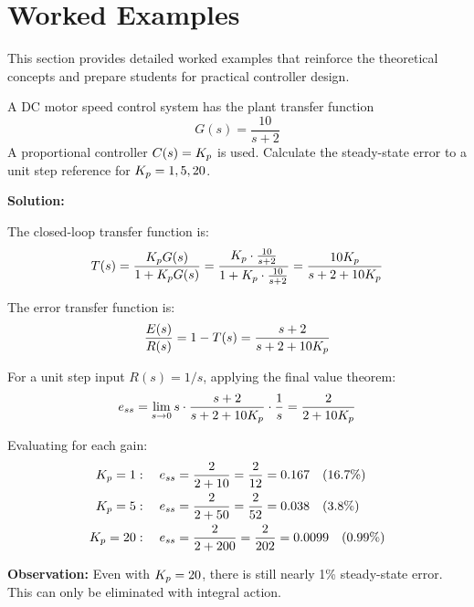 \section{Worked Examples}

This section provides detailed worked examples that reinforce the theoretical concepts and prepare students for practical controller design.

\begin{examplebox}
\label{ex:p_only_error}
A DC motor speed control system has the plant transfer function
\begin{equation*}
G(s) = \frac{10}{s + 2}
\end{equation*}
A proportional controller $C(s) = K_p$ is used. Calculate the steady-state error to a unit step reference for $K_p = 1, 5, 20$.

\textbf{Solution:}

The closed-loop transfer function is:
\begin{equation*}
T(s) = \frac{K_p G(s)}{1 + K_p G(s)} = \frac{K_p \cdot \frac{10}{s+2}}{1 + K_p \cdot \frac{10}{s+2}} = \frac{10K_p}{s + 2 + 10K_p}
\end{equation*}

The error transfer function is:
\begin{equation*}
\frac{E(s)}{R(s)} = 1 - T(s) = \frac{s + 2}{s + 2 + 10K_p}
\end{equation*}

For a unit step input $R(s) = 1/s$, applying the final value theorem:
\begin{equation*}
e_{ss} = \lim_{s \to 0} s \cdot \frac{s + 2}{s + 2 + 10K_p} \cdot \frac{1}{s} = \frac{2}{2 + 10K_p}
\end{equation*}

Evaluating for each gain:
\begin{align*}
K_p = 1: \quad e_{ss} &= \frac{2}{2 + 10} = \frac{2}{12} = 0.167 \quad (16.7\%) \\
K_p = 5: \quad e_{ss} &= \frac{2}{2 + 50} = \frac{2}{52} = 0.038 \quad (3.8\%) \\
K_p = 20: \quad e_{ss} &= \frac{2}{2 + 200} = \frac{2}{202} = 0.0099 \quad (0.99\%)
\end{align*}

\textbf{Observation:} Even with $K_p = 20$, there is still nearly 1\% steady-state error. This can only be eliminated with integral action.
\end{examplebox}

